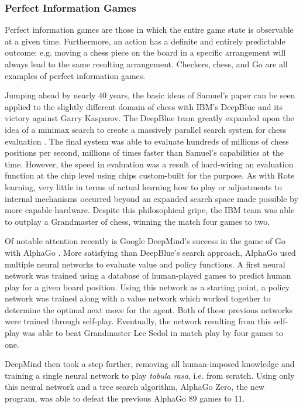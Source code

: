 

\subsubsection*{Perfect Information Games}

Perfect information games are those in which the entire game state is observable
at a given time.
%
Furthermore,
an action has a definite and entirely predictable outcome:
e.g. moving a chess piece on the board in a specific arrangement will always
lead to the same resulting arrangement.
%
Checkers, chess, and Go are all examples of perfect information games.

Jumping ahead by nearly 40 years,
the basic ideas of Samuel's paper can be seen applied to the slightly different
domain of chess with IBM's DeepBlue
and its victory against Garry Kasparov.
%
The DeepBlue team greatly expanded upon the idea of a minimax search to create a
massively parallel search system for chess evaluation
\cite{ibm_deepblue}.
%
The final system was able to evaluate hundreds of millions of chess positions
per second,
millions of times faster than Samuel's capabilities at the time.
%
However,
the speed in evaluation was a result of hard-wiring an evaluation function at
the chip level using chips custom-built for the purpose.
%
As with Rote learning,
very little in terms of actual learning how to play or adjustments to internal
mechanisms occurred
beyond an expanded search space made possible by more capable hardware.
%
Despite this philosophical gripe,
the IBM team was able to outplay a Grandmaster of chess,
winning the match four games to two.


Of notable attention recently is Google DeepMind's
success in the game of Go with AlphaGo
\cite{deepmind_alphago}.
%
More satisfying than DeepBlue's search approach,
AlphaGo used multiple neural networks to evaluate value and policy functions.
%
A first neural network was trained using a database of human-played games
to predict human play for a given board position.
%
Using this network as a starting point,
a policy network was trained
along with a value network which worked together to determine the optimal next
move for the agent.
%
Both of these previous networks were trained through self-play.
%
Eventually,
the network resulting from this self-play was able to beat Grandmaster Lee Sedol
in match play by four games to one.


DeepMind then took a step further,
removing all human-imposed knowledge and
training a single neural network to play \textit{tabula rasa}, i.e. from scratch.
%
Using only this neural network and a tree search algorithm,
AlphaGo Zero, the new program,
was able to defeat the previous AlphaGo 89 games to 11.


